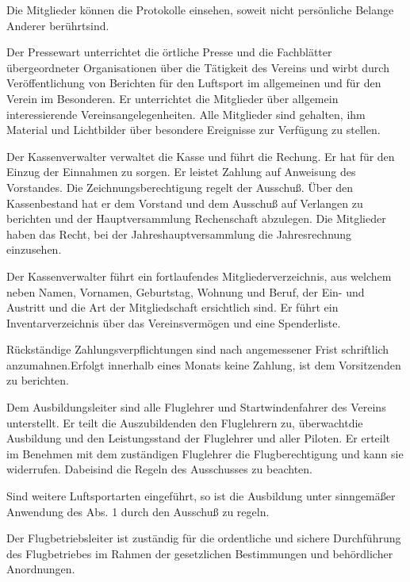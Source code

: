 \documentclass[11pt,a4paper,parskip=half]{scrartcl}
\begin{document}
\begin{contract}
\begin{multicols}{2}
		Die Mitglieder können die Protokolle einsehen,
    soweit nicht persönliche Belange Anderer berührtsind.

		Der Pressewart unterrichtet die örtliche Presse und die Fachblätter übergeordneter Organisationen über die Tätigkeit des Vereins und wirbt durch Veröffentlichung von Berichten für den Luftsport im allgemeinen und für den Verein im Besonderen.
		Er unterrichtet die Mitglieder über allgemein interessierende Vereinsangelegenheiten.
    Alle Mitglieder sind gehalten, ihm Material und Lichtbilder über besondere Ereignisse zur Verfügung zu stellen.

		Der Kassenverwalter verwaltet die Kasse und führt die Rechung.
    Er hat für den Einzug der Einnahmen zu sorgen.
    Er leistet Zahlung auf Anweisung des Vorstandes.
    Die Zeichnungsberechtigung regelt der Ausschuß.
    Über den Kassenbestand hat er dem Vorstand und dem Ausschuß auf Verlangen zu berichten und der Hauptversammlung Rechenschaft abzulegen.
    Die Mitglieder haben das Recht,
    bei der Jahreshauptversammlung die Jahresrechnung einzusehen.

		Der Kassenverwalter führt ein fortlaufendes Mitgliederverzeichnis,
    aus welchem neben Namen,
    Vornamen,
    Geburtstag,
    Wohnung und Beruf,
    der Ein- und Austritt und die Art der Mitgliedschaft ersichtlich sind.
    Er führt ein Inventarverzeichnis über das Vereinsvermögen und eine Spenderliste.

		Rückständige Zahlungsverpflichtungen sind nach angemessener Frist schriftlich anzumahnen.Erfolgt innerhalb eines Monats keine Zahlung,
    ist dem Vorsitzenden zu berichten.

		Dem Ausbildungsleiter sind alle Fluglehrer und Startwindenfahrer des Vereins unterstellt.
    Er teilt die Auszubildenden den Fluglehrern zu,
    überwachtdie Ausbildung und den Leistungsstand der Fluglehrer und aller Piloten.
    Er erteilt im Benehmen mit dem zuständigen Fluglehrer die Flugberechtigung und kann sie widerrufen.
    Dabeisind die Regeln des Ausschusses zu beachten.

		Sind weitere Luftsportarten eingeführt,
    so ist die Ausbildung unter sinngemäßer Anwendung des Abs. 1 durch den Ausschuß zu regeln.

		Der Flugbetriebsleiter ist zuständig für die ordentliche und sichere Durchführung des Flugbetriebes im Rahmen der gesetzlichen Bestimmungen und behördlicher Anordnungen.


\end{multicols}
\end{contract}
\end{document}
